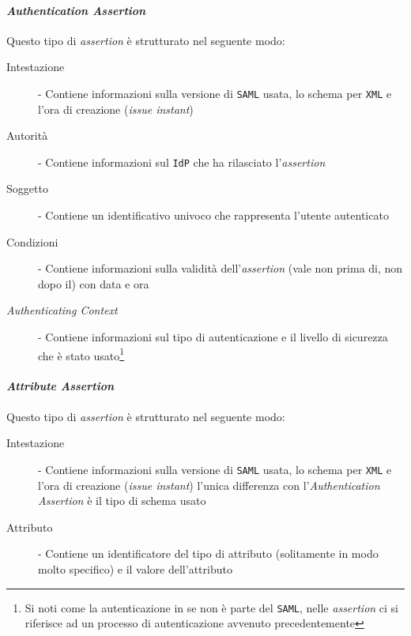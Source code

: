             \paragraph{\textit{Authentication Assertion}}
                Questo tipo di \textit{assertion} è strutturato nel seguente modo:
                \begin{description}
                    \item[Intestazione] - Contiene informazioni sulla versione di \texttt{SAML} usata, lo schema per \texttt{XML} e l'ora di creazione (\textit{issue instant})
                    \item[Autorità] - Contiene informazioni sul \texttt{IdP} che ha rilasciato l'\textit{assertion}
                    \item[Soggetto] - Contiene un identificativo univoco che rappresenta l'utente autenticato
                    \item[Condizioni] - Contiene informazioni sulla validità dell'\textit{assertion} (vale non prima di, non dopo il) con data e ora
                    \item[\textit{Authenticating Context}] - Contiene informazioni sul tipo di autenticazione e il livello di sicurezza che è stato usato\footnote{Si noti come la autenticazione in se non è parte del \texttt{SAML}, nelle \textit{assertion} ci si riferisce ad un processo di autenticazione avvenuto precedentemente}
                \end{description}
            \paragraph{\textit{Attribute Assertion}}
                Questo tipo di \textit{assertion} è strutturato nel seguente modo:
                \begin{description}
                    \item[Intestazione] - Contiene informazioni sulla versione di \texttt{SAML} usata, lo schema per \texttt{XML} e l'ora di creazione (\textit{issue instant}) l'unica differenza con l'\textit{Authentication Assertion} è il tipo di schema usato
                    \item[Attributo] - Contiene un identificatore del tipo di attributo (solitamente in modo molto specifico) e il valore dell'attributo
                \end{description}
